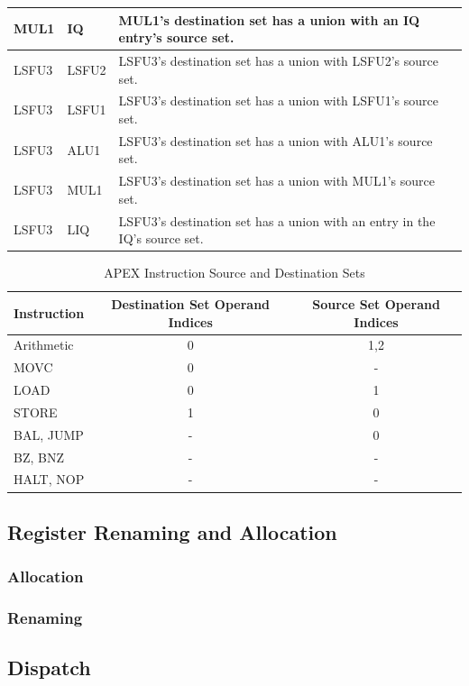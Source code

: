 \documentclass[12pt]{article}
\begin{document}
\begin{table}
\begin{tabular}{l|l|p{5.0in}}
    MUL1 & IQ & MUL1's destination set has a union with an IQ entry's source set. \\
    \hline
    LSFU3 & LSFU2 & LSFU3's destination set has a union with LSFU2's source set. \\
    LSFU3 & LSFU1 & LSFU3's destination set has a union with LSFU1's source set. \\
    LSFU3 & ALU1 & LSFU3's destination set has a union with ALU1's source set. \\
    LSFU3 & MUL1 & LSFU3's destination set has a union with MUL1's source set. \\
    LSFU3 & LIQ & LSFU3's destination set has a union with an entry in the IQ's source set. \\
  \end{tabular}
\end{table}

\begin{table}
  \centering
  \caption{APEX Instruction Source and Destination Sets}
  \label{tab:instsets}
  \begin{tabular}{l|c|c}
    Instruction & Destination Set Operand Indices & Source Set Operand Indices\\
    \hline
    Arithmetic					 	& 0 & 1,2\\
    MOVC 							& 0 & - \\
    LOAD							& 0 & 1 \\
    STORE							& 1 & 0 \\
    BAL, JUMP						& - & 0 \\
    BZ, BNZ 						& - & - \\
    HALT, NOP						& - & - \\
  \end{tabular}
\end{table}

\subsection{Register Renaming and Allocation}
\subsubsection{Allocation}
\subsubsection{Renaming}

\subsection{Dispatch}
\end{document}
